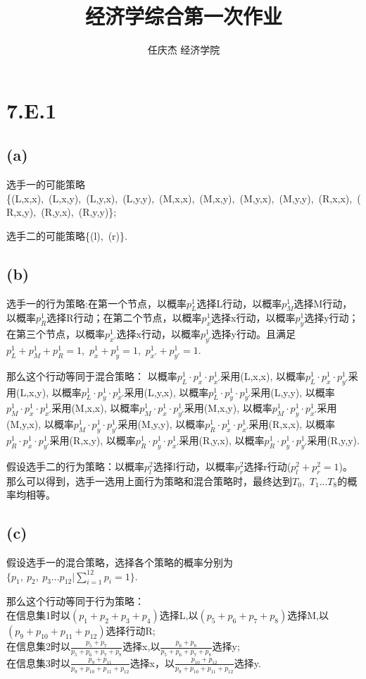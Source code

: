 \documentclass[10pt,fleqn]{article}
\title{经济学综合第一次作业}
\author{任庆杰 \quad 经济学院 \quad 1801211574}
\begin{document}
	\maketitle
\section*{7.E.1}
\subsection*{(a)}
选手一的可能策略\{(L,x,x),~(L,x,y),~(L,y,x),~(L,y,y),~(M,x,x),~(M,x,y),~(M,y,x),~(M,y,y),~(R,x,x),~(R,x,y),~(R,y,x),~(R,y,y)\};

选手二的可能策略\{(l),~(r)\}.
\subsection*{(b)}
选手一的行为策略:在第一个节点，以概率$p^1_L$选择L行动，以概率$p^1_M$选择M行动，以概率$p^1_R$选择R行动；在第二个节点，以概率$p_x^1$选择x行动，以概率$p_y^1$选择y行动；在第三个节点，以概率$p_{x'}^1$选择x行动，以概率$p_{y'}^1$选择y行动。且满足$p^1_L+p^1_M+p^1_R=1$,~$p^1_x+p^1_y=1$,~$p_{x'}^1+p_{y'}^1=1$.

那么这个行动等同于混合策略：
以概率$p^1_L \cdot p_x^1\cdot p_{x'}^1$采用(L,x,x),
以概率$p^1_L \cdot p_x^1\cdot p_{y'}^1$采用(L,x,y),
以概率$p^1_L \cdot p_y^1\cdot p_{x'}^1$采用(L,y,x),
以概率$p^1_L \cdot p_y^1\cdot p_{y'}^1$采用(L,y,y),
以概率$p^1_M \cdot p_x^1\cdot p_{x'}^1$采用(M,x,x),
以概率$p^1_M \cdot p_x^1\cdot p_{y'}^1$采用(M,x,y),
以概率$p^1_M \cdot p_y^1\cdot p_{x'}^1$采用(M,y,x),
以概率$p^1_M \cdot p_y^1\cdot p_{y'}^1$采用(M,y,y),
以概率$p^1_R \cdot p_x^1\cdot p_{x'}^1$采用(R,x,x),
以概率$p^1_R \cdot p_x^1\cdot p_{y'}^1$采用(R,x,y),
以概率$p^1_R \cdot p_y^1\cdot p_{x'}^1$采用(R,y,x),
以概率$p^1_R \cdot p_y^1\cdot p_{y'}^1$采用(R,y,y).

假设选手二的行为策略：以概率$p^2_l$选择l行动，以概率$p^2_r$选择r行动($p^2_l +p^2_r=1 $)。那么可以得到，选手一选用上面行为策略和混合策略时，最终达到$T_0$,~$T_1$...$T_8$的概率均相等。
\subsection*{(c)}
假设选手一的混合策略，选择各个策略的概率分别为$\{p_1,~p_2,~p_3...p_{12} \vert \sum_{i=1}^{12} p_i=1 \}$.

那么这个行动等同于行为策略：\\
在信息集1时以$(p_1+p_2+p_3+p_4)$选择L,以$(p_5+p_6+p_7+p_8)$选择M,以$(p_9+p_{10}+p_{11}+p_{12})$选择行动R;\\
在信息集2时以$\frac{p_5+p_7}{p_5+p_6+p_7+p_8}$选择x,以$\frac{p_6+p_8}{p_5+p_6+p_7+p_8}$选择y;\\
在信息集3时以$\frac{p_{9}+p_{11}}{p_9+p_{10}+p_{11}+p_{12}} $选择x，以$\frac{p_{10}+p_{12}}{p_9+p_{10}+p_{11}+p_{12}} $选择y.
\end{document}
